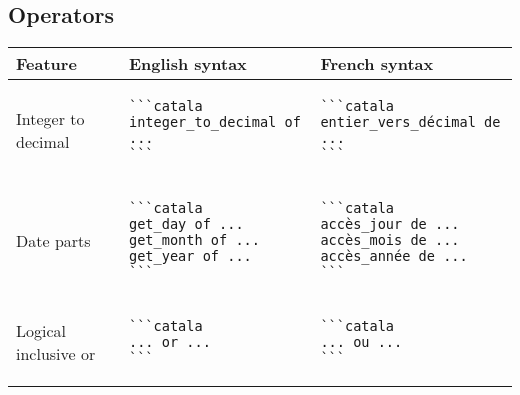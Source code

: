 \documentclass[a3paper,landscape]{article}
\begin{document}
\begin{multicols*}{2}
  \section*{Operators}
  \begin{center}
    \begin{tabular}{p{}p{}p{}}
      \toprule
      Feature                         & English syntax & French syntax \\\midrule
      Integer to decimal              &
      \vspace*{-1.75em}
      \begin{verbatim}
```catala
integer_to_decimal of ...
```
\end{verbatim}
      \vspace*{-1.75em}
                                      &
      \vspace*{-1.75em}
      \begin{verbatim}
```catala
entier_vers_décimal de ...
```
\end{verbatim}
      \vspace*{-1.75em}
      \\
      Date parts                      &
      \vspace*{-1.75em}
      \begin{verbatim}
```catala
get_day of ...
get_month of ...
get_year of ...
```
\end{verbatim}
      \vspace*{-1.75em}
                                      &
      \vspace*{-1.75em}
      \begin{verbatim}
```catala
accès_jour de ...
accès_mois de ...
accès_année de ...
```
\end{verbatim}
      \vspace*{-1.75em}
      \\
      Logical inclusive or            &
      \vspace*{-1.75em}
      \begin{verbatim}
```catala
... or ...
```
\end{verbatim}
      \vspace*{-1.75em}
                                      &
      \vspace*{-1.75em}
      \begin{verbatim}
```catala
... ou ...
```
\end{verbatim}
      \vspace*{-1.75em}

\end{tabular}
\end{center}
\end{multicols*}
\end{document}
